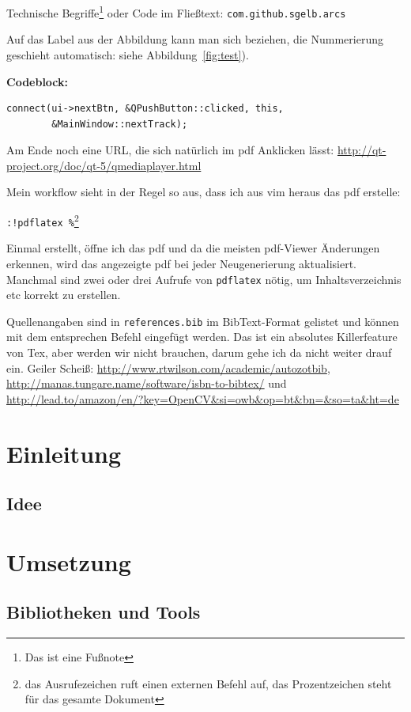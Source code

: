 Technische Begriffe\footnote{Das ist eine Fußnote} oder Code im Fließtext:
\texttt{com.github.sgelb.arcs}

Auf das Label aus der Abbildung kann man sich beziehen, die Nummerierung
geschieht automatisch: siehe Abbildung~\ref{fig:test}).


\textbf{Codeblock:}

\begin{lstlisting}
connect(ui->nextBtn, &QPushButton::clicked, this,
        &MainWindow::nextTrack);
\end{lstlisting}

Am Ende noch eine URL, die sich natürlich im pdf Anklicken lässt:
\url{http://qt-project.org/doc/qt-5/qmediaplayer.html}

Mein workflow sieht in der Regel so aus, dass ich aus vim heraus das pdf
erstelle:

\texttt{:!pdflatex \%}\footnote{das Ausrufezeichen ruft einen
externen Befehl auf, das Prozentzeichen steht für das gesamte Dokument}

Einmal erstellt, öffne ich das pdf und da die meisten pdf-Viewer Änderungen
erkennen, wird das angezeigte pdf bei jeder Neugenerierung aktualisiert.
Manchmal sind zwei oder drei Aufrufe von \texttt{pdflatex} nötig, um
Inhaltsverzeichnis etc korrekt zu erstellen.

Quellenangaben sind in \texttt{references.bib} im BibText-Format
\citep{wiki:bibtex} gelistet und können mit dem entsprechen Befehl eingefügt
werden. Das ist ein absolutes Killerfeature von Tex, aber werden wir nicht
brauchen, darum gehe ich da nicht weiter drauf ein. Geiler Scheiß:
\url{http://www.rtwilson.com/academic/autozotbib},
\url{http://manas.tungare.name/software/isbn-to-bibtex/} und
\url{http://lead.to/amazon/en/?key=OpenCV&si=owb&op=bt&bn=&so=ta&ht=de}


\section{Einleitung}  %
\subsection{Idee}  %
\section{Umsetzung}  %
\subsection{Bibliotheken und Tools}  %
